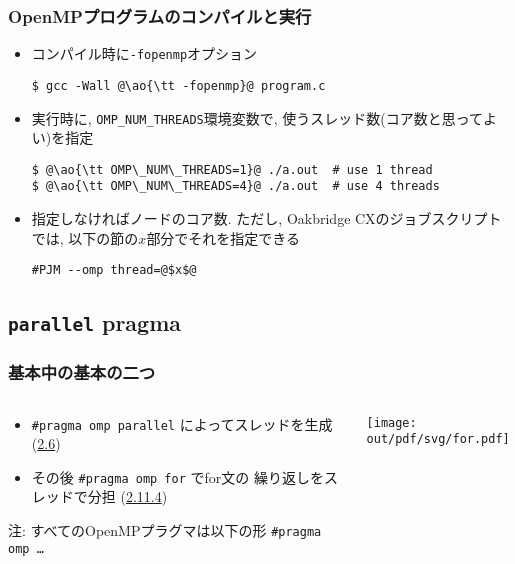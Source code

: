 \documentclass[10pt,dvipdfmx]{beamer}
\newcommand{\sectionompparallel}{\href{https://www.openmp.org/spec-html/5.1/openmpse14.html\#x59-590002.6}{2.6}}
\newcommand{\sectionompfor}{\href{https://www.openmp.org/spec-html/5.1/openmpsu48.html}{2.11.4}}
\newcommand{\ao}[1]{{\color{blue}#1}}
\begin{document}
\begin{frame}[fragile]
\frametitle{OpenMPプログラムのコンパイルと実行}

\begin{itemize}
\item コンパイル時に{\tt -fopenmp}オプション
\begin{lstlisting}
$ gcc -Wall @\ao{\tt -fopenmp}@ program.c
\end{lstlisting}
\item 実行時に, {\tt OMP\_NUM\_THREADS}環境変数で,
  使うスレッド数(コア数と思ってよい)を指定
\begin{lstlisting}
$ @\ao{\tt OMP\_NUM\_THREADS=1}@ ./a.out  # use 1 thread
$ @\ao{\tt OMP\_NUM\_THREADS=4}@ ./a.out  # use 4 threads
\end{lstlisting}


\iffalse
\item 指定しなければノードのコア数.
  ただし, Reedbushのジョブスクリプトでは, 以下の節の$x$部分でそれを指定できる
\begin{lstlisting}
#PBS -l select=1:ncpus=1:mpiprocs=1:ompthreads=@$x$@
\end{lstlisting}
\fi

\item 指定しなければノードのコア数.
  ただし, Oakbridge CXのジョブスクリプトでは,
  以下の節の$x$部分でそれを指定できる
\begin{lstlisting}
#PJM --omp thread=@$x$@
\end{lstlisting} %
\end{itemize}
\end{frame}

\subsection{{\tt parallel} pragma}

\begin{frame}
\frametitle{基本中の基本の二つ}
\begin{columns}
\begin{column}{0.5\textwidth}
\begin{itemize}

\item \ao{\tt \#pragma omp parallel}
  によってスレッドを生成 (\sectionompparallel)
\item その後 \ao{\tt \#pragma omp for} でfor文の
  繰り返しをスレッドで分担 (\sectionompfor)
\end{itemize}
注: すべてのOpenMPプラグマは以下の形
{\tt \#pragma omp \ldots}
\end{column}
\begin{column}{0.5\textwidth}
\texttt{[image: out/pdf/svg/for.pdf]}
\end{column}
\end{columns}
\end{frame}
\end{document}
